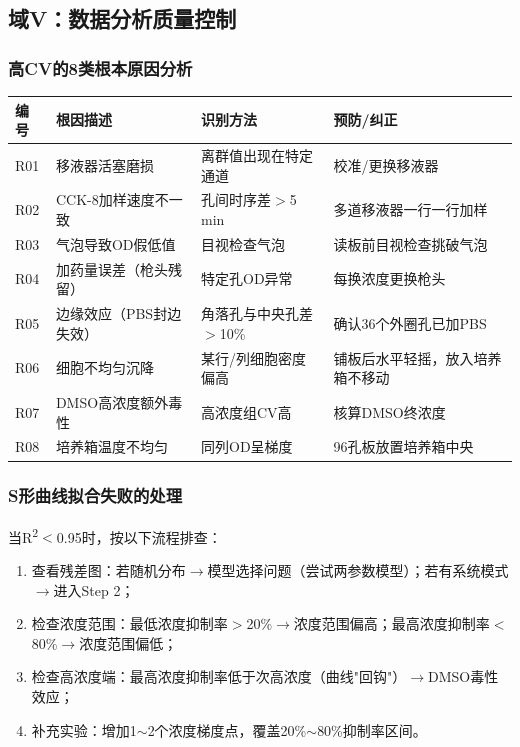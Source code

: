 \documentclass[12pt,a4paper]{article}
\begin{document}
\subsection{域V：数据分析质量控制}

\subsubsection{高CV的8类根本原因分析}

\begin{center}
\begin{tabularx}{\textwidth}{lXXX}
\toprule
\rowcolor{tabheadbg}\color{white}\textbf{编号} & \color{white}\textbf{根因描述} & \color{white}\textbf{识别方法} & \color{white}\textbf{预防/纠正} \\
\midrule
R01 & 移液器活塞磨损 & 离群值出现在特定通道 & 校准/更换移液器 \\
R02 & CCK-8加样速度不一致 & 孔间时序差$>$5\,min & 多道移液器一行一行加样 \\
R03 & 气泡导致OD假低值 & 目视检查气泡 & 读板前目视检查挑破气泡 \\
R04 & 加药量误差（枪头残留）& 特定孔OD异常 & 每换浓度更换枪头 \\
R05 & 边缘效应（PBS封边失效）& 角落孔与中央孔差$>$10\% & 确认36个外圈孔已加PBS \\
R06 & 细胞不均匀沉降 & 某行/列细胞密度偏高 & 铺板后水平轻摇，放入培养箱不移动 \\
R07 & DMSO高浓度额外毒性 & 高浓度组CV高 & 核算DMSO终浓度 \\
R08 & 培养箱温度不均匀 & 同列OD呈梯度 & 96孔板放置培养箱中央 \\
\bottomrule
\end{tabularx}
\end{center}

\subsubsection{S形曲线拟合失败的处理}

当R\textsuperscript{2}$<$0.95时，按以下流程排查：
\begin{enumerate}
\item 查看残差图：若随机分布$\to$模型选择问题（尝试两参数模型）；若有系统模式$\to$进入Step 2；
\item 检查浓度范围：最低浓度抑制率$>$20\%$\to$浓度范围偏高；最高浓度抑制率$<$80\%$\to$浓度范围偏低；
\item 检查高浓度端：最高浓度抑制率低于次高浓度（曲线"回钩"）$\to$DMSO毒性效应；
\item 补充实验：增加1$\sim$2个浓度梯度点，覆盖20\%$\sim$80\%抑制率区间。
\end{enumerate}
\end{document}
